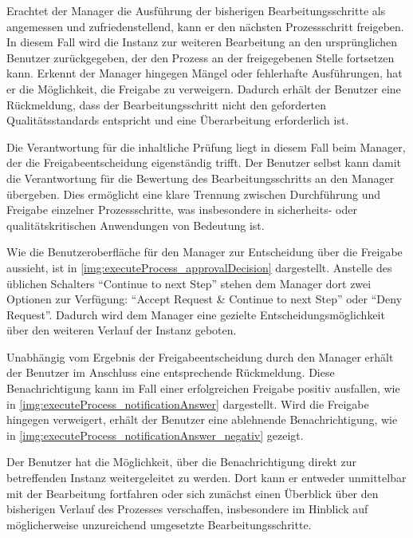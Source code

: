 
Erachtet der Manager die Ausführung der bisherigen Bearbeitungsschritte als angemessen und zufriedenstellend, kann er den nächsten Prozessschritt freigeben. In diesem Fall wird die Instanz zur weiteren Bearbeitung an den ursprünglichen Benutzer zurückgegeben, der den Prozess an der freigegebenen Stelle fortsetzen kann. Erkennt der Manager hingegen Mängel oder fehlerhafte Ausführungen, hat er die Möglichkeit, die Freigabe zu verweigern. Dadurch erhält der Benutzer eine Rückmeldung, dass der Bearbeitungsschritt nicht den geforderten Qualitätsstandards entspricht und eine Überarbeitung erforderlich ist.

Die Verantwortung für die inhaltliche Prüfung liegt in diesem Fall beim Manager, der die Freigabeentscheidung eigenständig trifft. Der Benutzer selbst kann damit die Verantwortung für die Bewertung des Bearbeitungsschritts an den Manager übergeben. Dies ermöglicht eine klare Trennung zwischen Durchführung und Freigabe einzelner Prozessschritte, was insbesondere in sicherheits- oder qualitätskritischen Anwendungen von Bedeutung ist.

Wie die Benutzeroberfläche für den Manager zur Entscheidung über die Freigabe aussieht, ist in \autoref{img:executeProcess_approvalDecision} dargestellt. Anstelle des üblichen Schalters \enquote{Continue to next Step} stehen dem Manager dort zwei Optionen zur Verfügung: \enquote{Accept Request \& Continue to next Step} oder \enquote{Deny Request}. Dadurch wird dem Manager eine gezielte Entscheidungsmöglichkeit über den weiteren Verlauf der Instanz geboten.


Unabhängig vom Ergebnis der Freigabeentscheidung durch den Manager erhält der Benutzer im Anschluss eine entsprechende Rückmeldung. Diese Benachrichtigung kann im Fall einer erfolgreichen Freigabe positiv ausfallen, wie in \autoref{img:executeProcess_notificationAnswer} dargestellt. Wird die Freigabe hingegen verweigert, erhält der Benutzer eine ablehnende Benachrichtigung, wie in \autoref{img:executeProcess_notificationAnswer_negativ} gezeigt.



Der Benutzer hat die Möglichkeit, über die Benachrichtigung direkt zur betreffenden Instanz weitergeleitet zu werden. Dort kann er entweder unmittelbar mit der Bearbeitung fortfahren oder sich zunächst einen Überblick über den bisherigen Verlauf des Prozesses verschaffen, insbesondere im Hinblick auf möglicherweise unzureichend umgesetzte Bearbeitungsschritte.

